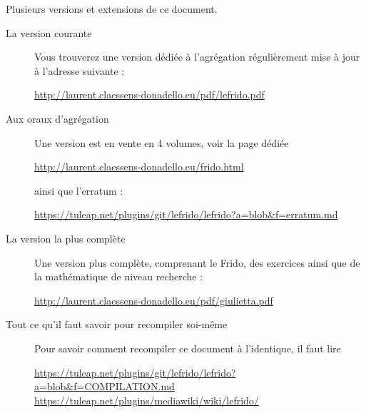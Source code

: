 
\thispagestyle{empty}

Plusieurs versions et extensions de ce document.
\begin{description}

    \item[La version courante]

        Vous trouverez une version dédiée à l'agrégation régulièrement mise à jour à l'adresse suivante :
        \begin{center}
            \url{http://laurent.claessens-donadello.eu/pdf/lefrido.pdf}
        \end{center}

    \item[Aux oraux d'agrégation]

        Une version est en vente en 4 volumes, voir la page dédiée
        \begin{center}
            \url{http://laurent.claessens-donadello.eu/frido.html}
        \end{center}
        ainsi que l'erratum :
        \begin{center}
            \url{https://tuleap.net/plugins/git/lefrido/lefrido?a=blob&f=erratum.md}\\
        \end{center}

    \item[La version la plus complète]

        Une version plus complète, comprenant le Frido, des exercices ainsi que de la mathématique de niveau recherche :
        \begin{center}
        \url{http://laurent.claessens-donadello.eu/pdf/giulietta.pdf}
        \end{center}

    \item[Tout ce qu'il faut savoir pour recompiler soi-même]
        Pour savoir comment recompiler ce document à l'identique, il faut lire
        \begin{center}
            \url{https://tuleap.net/plugins/git/lefrido/lefrido?a=blob&f=COMPILATION.md}\\
            \url{https://tuleap.net/plugins/mediawiki/wiki/lefrido/}
        \end{center}

\end{description}
